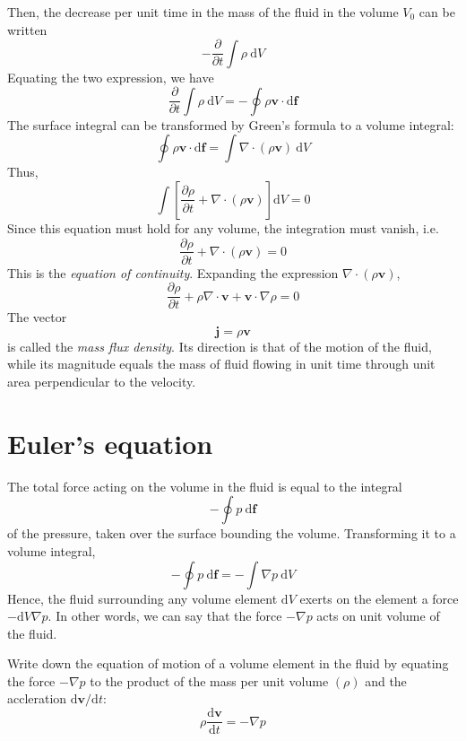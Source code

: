 \documentclass[conference]{IEEEtran}
\theoremstyle{definition}
\theoremstyle{remark}
\begin{document}
    Then, the decrease per unit time in the mass of the fluid in the volume $V_0$ can be written
    \[
        -\dfrac{\partial}{\partial t} \int \rho \ \mathrm{d} V
    \]
    Equating the two expression, we have
    \[
        \dfrac{\partial}{\partial t} \int \rho \ \mathrm{d} V = - \oint \rho \mathbf{v} \cdot \mathrm{d} \mathbf{f}
    \]
    The surface integral can be transformed by Green's formula to a volume integral:
    \[
        \oint \rho \mathbf{v} \cdot \mathrm{d} \mathbf{f} = \int \nabla \cdot (\rho \mathbf{v}) \ \mathrm{d} V
    \]
    Thus,
    \[
        \int \left[ \dfrac{\partial \rho}{\partial t} + \nabla \cdot (\rho \mathbf{v}) \right] \mathrm{d} V = 0
    \]
    Since this equation must hold for any volume, the integration must vanish, i.e.
    \begin{equation}
        \dfrac{\partial \rho}{\partial t} + \nabla \cdot (\rho \mathbf{v}) = 0
        \label{eq:continuity}
    \end{equation}
    This is the \emph{equation of continuity}. Expanding the expression $\nabla \cdot (\rho \mathbf{v})$,
    \begin{equation}
        \dfrac{\partial \rho}{\partial t} + \rho \nabla \cdot \mathbf{v} + \mathbf{v} \cdot \nabla \rho = 0
    \end{equation}
    The vector
    \begin{equation}
        \mathbf{j} = \rho \mathbf{v}
    \end{equation}
    is called the \emph{mass flux density}. Its direction is that of the motion of the fluid, while its magnitude equals the mass of fluid flowing in unit time through unit area perpendicular to the velocity.

    \section{Euler's equation}
    The total force acting on the volume in the fluid is equal to the integral
    \[
        -\oint p \ \mathrm{d} \mathbf{f}
    \]
    of the pressure, taken over the surface bounding the volume. Transforming it to a volume integral,
    \[
        -\oint p \ \mathrm{d} \mathbf{f} = - \int \nabla p \ \mathrm{d} V
    \]
    Hence, the fluid surrounding any volume element $\mathrm{d} V$ exerts on the element a force $-\mathrm{d} V \nabla p$. In other words, we can say that the force $-\nabla p$ acts on unit volume of the fluid.

    Write down the equation of motion of a volume element in the fluid by equating the force $-\nabla p$ to the product of the mass per unit volume $(\rho)$ and the accleration $\mathrm{d} \mathbf{v} / \mathrm{d} t$:
    \begin{equation}
        \rho \dfrac{\mathrm{d} \mathbf{v}}{\mathrm{d} t} = -\nabla p
        \label{eq:force}
    \end{equation}
\end{document}

